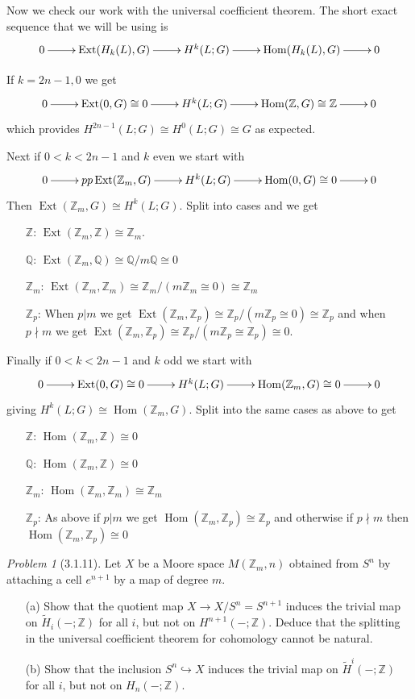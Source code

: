 \documentclass[10pt]{article}
\newcommand{\sk}{\vskip 10mm}
\newcommand{\bb}[1]{\mathbb{#1}}
\newcommand{\rH}{\widetilde{H}}
\DeclareMathOperator{\Ext}{Ext}
\DeclareMathOperator{\Hom}{Hom}
\theoremstyle{remark}
\newtheorem{problem}{Problem}
\begin{document}
Now we check our work with the universal coefficient theorem. The
short exact sequence that we will be using is
\[
  \xymatrix{
    0 \ar[r] & \Ext(H_k(L),G) \ar[r] & H^k(L;G) \ar[r] & \Hom(H_k(L),G) \ar[r] & 0
  }
\]

If $k=2n-1,0$ we get
\[
  \xymatrix{
    0 \ar[r] & \Ext(0,G)\cong 0 \ar[r] & H^k(L;G) \ar[r] & \Hom(\bb{Z},G)\cong \bb{Z} \ar[r] & 0
  }
\]
which provides $H^{2n-1}(L;G)\cong H^0(L;G)\cong G$ as expected.

Next if $0<k<2n-1$ and $k$ even we start with
\[
  \xymatrix{
    0 \ar[r] &pp \Ext(\bb{Z}_m,G)\ar[r] & H^k(L;G) \ar[r] & \Hom(0,G)\cong 0 \ar[r] & 0
  }
\]
Then $\Ext(\bb{Z}_m,G)\cong H^k(L;G)$. Split into cases and we get
\begin{itemize}
\item[$\bb{Z}$:] $\Ext(\bb{Z}_m,\bb{Z})\cong\bb{Z}_m$.
\item[$\bb{Q}$:] $\Ext(\bb{Z}_m,\bb{Q})\cong \bb{Q}/m\bb{Q}\cong 0$
\item[$\bb{Z}_m$:] $\Ext(\bb{Z}_m,\bb{Z}_m)\cong \bb{Z}_m/(m\bb{Z}_m\cong 0)\cong \bb{Z}_m$
\item[$\bb{Z}_p$:] When $p|m$ we get $\Ext(\bb{Z}_m,\bb{Z}_p)\cong \bb{Z}_p/(m\bb{Z}_p\cong 0)\cong \bb{Z}_p$
  and when $p\nmid m$ we get $\Ext(\bb{Z}_m,\bb{Z}_p)\cong \bb{Z}_p/(m\bb{Z}_p\cong \bb{Z}_p)\cong 0$.
\end{itemize}

Finally if $0<k<2n-1$ and $k$ odd we start with
\[
  \xymatrix{
    0 \ar[r] & \Ext(0,G)\cong 0\ar[r] & H^k(L;G) \ar[r] & \Hom(\bb{Z}_m,G)\cong 0 \ar[r] & 0      
  }
\]
giving $H^k(L;G)\cong\Hom(\bb{Z}_m,G)$. Split into the same cases as above to get
\begin{itemize}
\item[$\bb{Z}$:] $\Hom(\bb{Z}_m,\bb{Z})\cong 0$
\item[$\bb{Q}$:] $\Hom(\bb{Z}_m,\bb{Z})\cong 0$
\item[$\bb{Z}_m$:] $\Hom(\bb{Z}_m,\bb{Z}_m)\cong \bb{Z}_m$
\item[$\bb{Z}_p$:] As above if $p|m$ we get $\Hom(\bb{Z}_m,\bb{Z}_p)\cong \bb{Z}_p$
  and otherwise if $p\nmid m$ then $\Hom(\bb{Z}_m,\bb{Z}_p)\cong 0$
\end{itemize}

\sk

\begin{problem}[3.1.11]
  Let $X$ be a Moore space $M(\bb{Z}_m,n)$ obtained from $S^n$ by attaching
  a cell $e^{n+1}$ by a map of degree $m$.
  \begin{itemize}
  \item[(a)] Show that the quotient map $X\rightarrow X/S^n=S^{n+1}$ induces the
    trivial map on $\rH_i(-;\bb{Z})$ for all $i$, but not on
    $H^{n+1}(-;\bb{Z})$. Deduce that the splitting in the universal coefficient
    theorem for cohomology cannot be natural.
  \item[(b)] Show that the inclusion $S^n\hookrightarrow X$ induces the trivial
    map on $\rH^i(-;\bb{Z})$ for all $i$, but not on $H_n(-;\bb{Z})$.
  \end{itemize}
\end{problem}
\end{document}
